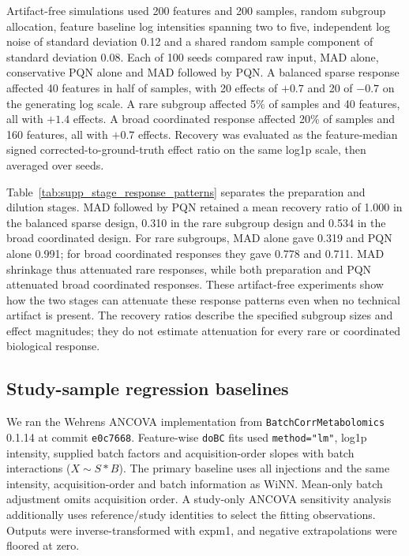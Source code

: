 \documentclass[namedate,webpdf,modern,large,nocrop]{oup-authoring-template}
\begin{document}
Artifact-free simulations used 200 features and 200 samples, random subgroup allocation, feature baseline log intensities spanning two to five, independent log noise of standard deviation 0.12 and a shared random sample component of standard deviation 0.08. Each of 100 seeds compared raw input, MAD alone, conservative PQN alone and MAD followed by PQN. A balanced sparse response affected 40 features in half of samples, with 20 effects of $+0.7$ and 20 of $-0.7$ on the generating log scale. A rare subgroup affected 5\% of samples and 40 features, all with $+1.4$ effects. A broad coordinated response affected 20\% of samples and 160 features, all with $+0.7$ effects. Recovery was evaluated as the feature-median signed corrected-to-ground-truth effect ratio on the same log1p scale, then averaged over seeds.

Table~\ref{tab:supp_stage_response_patterns} separates the preparation and dilution stages. MAD followed by PQN retained a mean recovery ratio of 1.000 in the balanced sparse design, 0.310 in the rare subgroup design and 0.534 in the broad coordinated design. For rare subgroups, MAD alone gave 0.319 and PQN alone 0.991; for broad coordinated responses they gave 0.778 and 0.711. MAD shrinkage thus attenuated rare responses, while both preparation and PQN attenuated broad coordinated responses. These artifact-free experiments show how the two stages can attenuate these response patterns even when no technical artifact is present. The recovery ratios describe the specified subgroup sizes and effect magnitudes; they do not estimate attenuation for every rare or coordinated biological response.

\subsection{Study-sample regression baselines}

We ran the Wehrens ANCOVA implementation \citep{Wehrens2016BatchCorr} from \texttt{BatchCorrMetabolomics} 0.1.14 at commit \texttt{e0c7668}. Feature-wise \texttt{doBC} fits used \texttt{method="lm"}, log1p intensity, supplied batch factors and acquisition-order slopes with batch interactions ($X\sim S*B$). The primary baseline uses all injections and the same intensity, acquisition-order and batch information as WiNN. Mean-only batch adjustment omits acquisition order. A study-only ANCOVA sensitivity analysis additionally uses reference/study identities to select the fitting observations. Outputs were inverse-transformed with expm1, and negative extrapolations were floored at zero.
\end{document}
